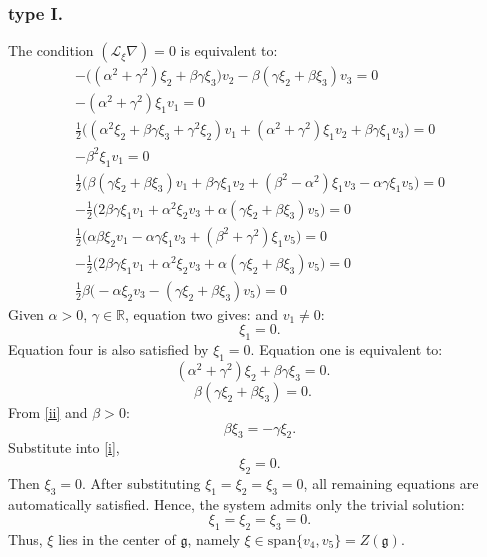 \documentclass[10pt]{article}
\begin{document}
\subsubsection{type I.} 
The condition $(\mathscr{L}_\xi\nabla) =0$ is equivalent to: \begin{eqnarray} 
-\Big((\alpha^2+\gamma^2)\xi_2+\beta\gamma\xi_3\Big) v_2-\beta(\gamma\xi_2+\beta\xi_3)v_3 =0 \\ 
        -(\alpha^2+\gamma^2)\xi_1 v_1 =0 \\ 
        \tfrac{1}{2}\Big((\alpha^2\xi_2+\beta\gamma\xi_3+\gamma^2\xi_2) v_1 +(\alpha^2+\gamma^2)\xi_1 v_2+\beta\gamma\xi_1 v_3\Big) =0\\
        -\beta^2\xi_1 v_1=0\\
         \tfrac{1}{2}\Big(\beta(\gamma\xi_2+\beta\xi_3)v_1+\beta\gamma\xi_1 v_2+(\beta^2-\alpha^2)\xi_1 v_3-\alpha\gamma\xi_1 v_5\Big) =0 \\ 
        -\tfrac{1}{2}\Big(2\beta\gamma\xi_1 v_1+\alpha^2\xi_2 v_3 +\alpha(\gamma\xi_2+\beta\xi_3) v_5\Big) =0\\
        \tfrac{1}{2}\Big(\alpha\beta\xi_2v_1-\alpha\gamma\xi_1 v_3+(\beta^2+\gamma^2)\xi_1 v_5\Big) =0 \\ 
        -\tfrac{1}{2}\Big(2\beta\gamma\xi_1 v_1+\alpha^2\xi_2 v_3 +\alpha(\gamma\xi_2+\beta\xi_3) v_5\Big) =0\\
        \tfrac{1}{2}\beta\Big(-\alpha\xi_2v_3-(\gamma\xi_2+\beta\xi_3)v_5\Big)=0
\end{eqnarray} 
Given $\alpha > 0$, $\gamma \in \mathbb{R}$, equation two gives:
 and $v_1 \neq 0$:
\begin{equation*}
\xi_1 = 0.
\end{equation*}
Equation four is also satisfied by $\xi_1 = 0$.
Equation one is equivalent to:
\begin{equation}
(\alpha^2 + \gamma^2)\xi_2 + \beta\gamma\xi_3 = 0. \quad \label{i} \end{equation}
\begin{equation}
\beta(\gamma\xi_2 + \beta\xi_3) = 0. \quad \label{ii}
\end{equation}
From \eqref{ii} and $\beta > 0$:
\begin{equation*}
\beta\xi_3 = -\gamma\xi_2.
\end{equation*}
Substitute into \eqref{i},
\begin{equation*}
\xi_2 = 0.
\end{equation*}
Then $\xi_3 = 0$.
After substituting \(\xi_1 = \xi_2 = \xi_3 = 0\), all remaining equations are automatically satisfied. Hence, the system admits only the trivial solution:
\begin{equation*}
\xi_1 = \xi_2 = \xi_3 = 0.
\end{equation*}
Thus, $\xi$ lies in the center of $\mathfrak {g}$, namely $\xi \in \mathrm{span}\{v_4,v_5\} = Z(\mathfrak {g})$.
\end{document}
